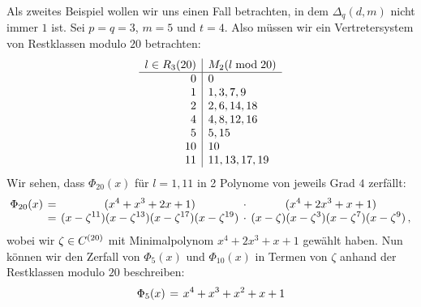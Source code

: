 
\begin{beispiel}
  Als zweites Beispiel wollen wir uns einen Fall betrachten, 
  in dem $\Delta_q(d,m)$ nicht immer $1$ ist.
  Sei $p=q=3$, $m=5$ und $t= 4$.
  Also müssen wir ein Vertretersystem von Restklassen modulo $20$ betrachten:
  \[\begin{array}[t]{r|l}
    l \in R_3(20) & M_2(l \bmod 20) \\\hline
    0 & 0 \\
    1 & 1, 3, 7, 9 \\
    2 & 2, 6, 14, 18 \\
    4 & 4, 8, 12, 16 \\
    5 & 5, 15 \\
    10& 10 \\
    11& 11, 13, 17, 19 
    \end{array}\]
  Wir sehen, dass $\Phi_{20}(x)$ für $l=1,11$ in 
  2 Polynome von jeweils Grad $4$ zerfällt:
  \[\setlength{\arraycolsep}{2pt}\everymath{\displaystyle}
    \begin{array}{rcccc} 
      \Phi_{20}(x) &=& 
        (x^{4} + x^{3} + 2 x + 1) &\cdot& (x^{4} + 2 x^{3} + x + 1) \\
      &=& (x-\zeta^{11})(x-\zeta^{13})(x-\zeta^{17})(x-\zeta^{19}) &\cdot&
        (x-\zeta)(x-\zeta^{3})(x-\zeta^{7})(x-\zeta^{9})\,,
    \end{array}\]
  wobei wir $\zeta \in C^{(20)}$ mit Minimalpolynom $x^4+2x^3+x+1$ gewählt
  haben.
  Nun können wir den Zerfall von $\Phi_5(x)$ und $\Phi_{10}(x)$ in Termen von
  $\zeta$ anhand der Restklassen modulo $20$ beschreiben:
  \[\setlength{\arraycolsep}{2pt}\everymath{\displaystyle}
    \begin{array}{rcccc} 
      \Phi_5(x)&=& x^4 + x^3 + x^2 + x + 1\\

\end{array}\]
\end{beispiel}
